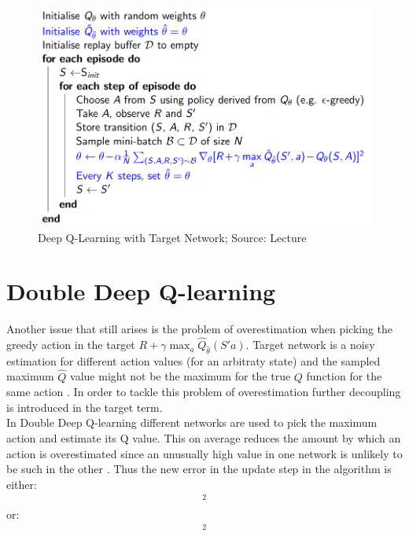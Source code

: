 \begin{figure}[H]
\centering
\includegraphics[scale=0.4]{figures/dqn wth target.PNG}
  \caption{Deep Q-Learning with Target Network; Source: Lecture}
  \label{fig:target_network_algorithm}
\end{figure}

\section{Double Deep Q-learning}
Another issue that still arises is the problem of overestimation when picking the greedy action in the target $R + \gamma \max_a \hat{Q}_{\hat{\theta}}(S' a)$. Target network is a noisy estimation for different action values (for an arbitraty state) and the sampled maximum $\hat{Q}$ value might not be the maximum for the true $Q$ function for the same action \cite{lecture_dqn}. In order to tackle this problem of overestimation 
further decoupling is introduced in the target term.\\

In Double Deep Q-learning different networks are used to pick the maximum action and estimate its Q value. This on average reduces the amount by which an action is overestimated since an unusually high value in one network is unlikely to be such in the other \cite{lecture_dqn}. Thus the new error in the update step in the algorithm is either:
\begin{align}
    [R + \gamma Q_{\theta}(S', \text{arg}\max_a\ \hat{Q}_{\hat{\theta}}(S', a)) - Q_{\theta}(S, A)]^2
\end{align}
or:
\begin{align}
    [R + \gamma \hat{Q}_{\hat{\theta}}(S', \text{arg}\max_a\ Q_{\theta}(S', a)) - Q_{\theta}(S, A)]^2
\end{align}


